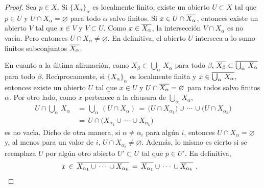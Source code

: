 \begin{proof}
	Sea $p\in X$. Si $\{X_{\alpha}\}_{\alpha}$ es localmente finito,
	existe un abierto $U\subset X$ tal que $p\in U$ y
	$U\cap X_{\alpha}=\varnothing$ para todo $\alpha$ salvo finitos.
	Si $x\in U\cap\overline{X_{\alpha}}$, entonces existe un abierto
	$V$ tal que $x\in V$ y $V\subset U$. Como $x\in\overline{X_{\alpha}}$,
	la intersecci\'{o}n $V\cap X_{\alpha}$ es no vac\'{\i}a. Pero entonces
	$U\cap X_{\alpha}\not=\varnothing$. En definitiva, el abierto $U$
	interseca a lo sumo finitos subconjuntos $\overline{X_{\alpha}}$.

	En cuanto a la \'{u}ltima afirmaci\'{o}n, como
	$X_{\beta}\subset\bigcup_{\alpha}\,X_{\alpha}$ para todo $\beta$,
	$\overline{X_{\beta}}\subset\overline{\bigcup_{\alpha}\,X_{\alpha}}$ para
	todo $\beta$. Rec\'{\i}procamente, si $\{X_{\alpha}\}_{\alpha}$
	es localmente finita y $x\in\overline{\bigcup_{\alpha}\,X_{\alpha}}$,
	entonces existe un abierto $U$ tal que $x\in U$ y
	$U\cap\overline{X_{\alpha}}=\varnothing$ para todos salvo finitos
	$\alpha$. Por otro lado, como $x$ pertenece a la clausura de
	$\bigcup_{\alpha}\,X_{\alpha}$,
	\begin{align*}
		U\cap\bigcup_{\alpha}\,X_{\alpha} & \,=\,
		\bigcup_{\alpha}\,(U\cap X_{\alpha})
		\,=\, \big(U\cap X_{\alpha_{1}}\big)\cup\,\cdots\,\cup
			\big(U\cap X_{\alpha_{k}}\big) \\
		& \,=\, U\cap\big(X_{\alpha_{1}}\cup\,\cdots\,
			\cup X_{\alpha_{k}}\big)
	\end{align*}
	es no vac\'{\i}a. Dicho de otra manera, si $\alpha\not =\alpha_{i}$
	para alg\'{u}n $i$, entonces $U\cap X_{\alpha}=\varnothing$ y, al
	menos para un valor de $i$, $U\cap X_{\alpha_{i}}\not=\varnothing$.
	Adem\'{a}s, lo mismo es cierto si se reemplaza $U$ por alg\'{u}n otro
	abierto $U'\subset U$ tal que $p\in U'$. En definitiva,
	\begin{align*}
		x & \,\in\,\overline{X_{\alpha_{1}}\cup\,\cdots\,
			\cup X_{\alpha_{k}}} \,=\,
			\overline{X_{\alpha_{1}}}\cup\,\cdots\,
			\cup\overline{X_{\alpha_{k}}}
		\text{ .}
	\end{align*}
\end{proof}


